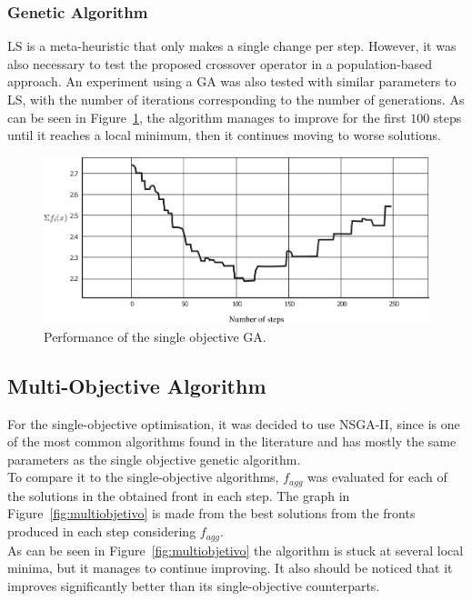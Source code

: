 \subsubsection{Genetic Algorithm}

LS is a meta-heuristic that only makes a single change per step. However, it was also necessary to test the proposed crossover operator in a population-based approach. An experiment using a GA was also tested with similar parameters to LS, with the number of iterations corresponding to the number of generations. As can be seen in Figure~\ref{fig:genetico}, the algorithm manages to improve for the first $100$ steps until it reaches a local minimum, then it continues moving to worse solutions.

\begin{figure}
    \centering
    \includegraphics[width=\textwidth]{images/genetic_algorithm.png}
    \caption{Performance of the single objective GA.}
    \label{fig:genetico}
\end{figure}

\subsection{Multi-Objective Algorithm}

For the single-objective optimisation, it was decided to use NSGA-II, since is one of the most common algorithms found in the literature and has mostly the same parameters as the single objective genetic algorithm.\\

To compare it to the single-objective algorithms, $f_{agg}$ was evaluated for each of the solutions in the obtained front in each step. The graph in Figure~\ref{fig:multiobjetivo} is made from the best solutions from the fronts produced in each step considering $f_{agg}$.\\

As can be seen in Figure~\ref{fig:multiobjetivo} the algorithm is stuck at several local minima, but it manages to continue improving. It also should be noticed that it improves significantly better than its single-objective counterparts.

